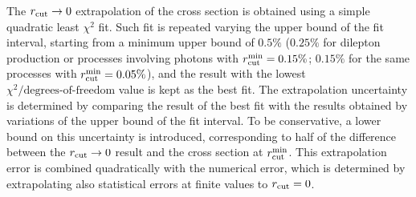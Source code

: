 \documentclass[english,11pt]{article}
\begin{document}
The $r_{\mathrm{cut}}{}\rightarrow 0$ extrapolation of the cross section is
obtained using a 
simple quadratic least $\chi^2$ fit.
Such fit is repeated varying the upper bound of the fit interval, starting from a minimum 
upper bound of $0.5\%$ ($0.25\%$ for dilepton production or processes involving photons with $r_{\mathrm{cut}}^\mathrm{min}{}=0.15\%$; $0.15\%$ for the same processes with $r_{\mathrm{cut}}^\mathrm{min}{}=0.05\%$), and the result with the lowest $\chi^2/\text{degrees-of-freedom}$ value is kept as the best fit. 
The extrapolation uncertainty is determined by comparing the result of the best fit with the results obtained
by variations of the upper bound of the fit interval. To be conservative, a lower bound on this uncertainty is introduced, corresponding 
to half of the difference between the $r_{\mathrm{cut}}{}\rightarrow 0$ result and the 
cross section at $r_{\mathrm{cut}}^\mathrm{min}{}$. This extrapolation error is combined quadratically with the numerical 
error, which is determined by extrapolating also statistical errors at finite \rcut{} values to  $r_{\mathrm{cut}}{}=0$.
\end{document}
